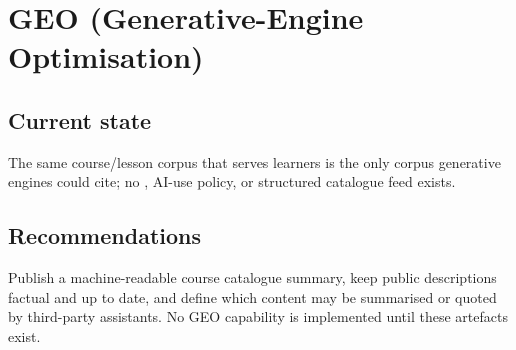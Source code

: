 \section{GEO (Generative-Engine Optimisation)}
\label{sec:geo}

\subsection{Current state}

The same course/lesson corpus that serves learners is the only corpus generative engines could cite; no , AI-use policy, or structured catalogue feed exists.

\subsection{Recommendations}

Publish a machine-readable course catalogue summary, keep public descriptions factual and up to date, and define which content may be summarised or quoted by third-party assistants. No GEO capability is implemented until these artefacts exist.
